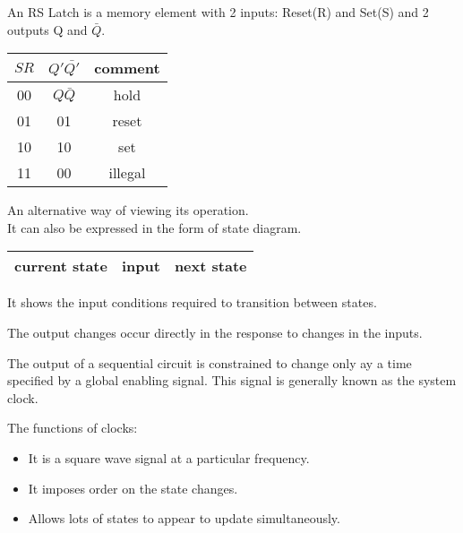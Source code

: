 \documentclass[a4paper]{article}
\begin{document}
\begin{defi}[RS Latch]
An RS Latch is a memory element with 2 inputs: Reset(R) and Set(S) and 2 outputs Q and $\bar{Q}$.\\
\begin{tabular}{|c|c|c|}
\hline 
$SR$ & $Q'\bar{Q'}$ & comment \\ 
\hline 
00 & $Q\bar{Q}$ & hold \\ 
\hline 
01 & 01 & reset \\ 
\hline 
10 & 10 & set \\ 
\hline 
11 & 00 & illegal \\ 
\hline 
\end{tabular} 
\end{defi}

\begin{defi}
An alternative way of viewing its operation.\\
It can also be expressed in the form of state diagram.\\
\begin{tabular}{|c|c|c|}
\hline 
current state & input & next state \\ 
\hline 
\end{tabular} 
\end{defi}
\begin{defi}
It shows the input conditions required to transition between states.
\end{defi}

\begin{defi}
The output changes occur directly in the response to changes in the inputs.
\end{defi}

\begin{defi}
The output of a sequential circuit is constrained to change only ay a time specified by a global enabling signal. This signal is generally known as the system clock.
\end{defi}

The functions of clocks:
\begin{itemize}
\item It is a square wave signal at a particular frequency.
\item It imposes order on the state changes.
\item Allows lots of states to appear to update simultaneously.
\end{itemize}
\end{document}
